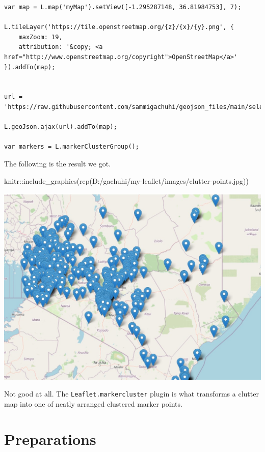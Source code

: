 \documentclass[
]{book}
\newenvironment{Shaded}{\begin{snugshade}}{\end{snugshade}}
\newcommand{\FunctionTok}[1]{\textcolor[rgb]{0.00,0.00,0.00}{#1}}
\newcommand{\NormalTok}[1]{#1}
\newcommand{\SpecialCharTok}[1]{\textcolor[rgb]{0.00,0.00,0.00}{#1}}
\newcommand{\StringTok}[1]{\textcolor[rgb]{0.31,0.60,0.02}{#1}}
\begin{document}
\begin{verbatim}
var map = L.map('myMap').setView([-1.295287148, 36.81984753], 7);

L.tileLayer('https://tile.openstreetmap.org/{z}/{x}/{y}.png', {
    maxZoom: 19,
    attribution: '&copy; <a href="http://www.openstreetmap.org/copyright">OpenStreetMap</a>'
}).addTo(map);


url = 'https://raw.githubusercontent.com/sammigachuhi/geojson_files/main/selected_hospitals.json'

L.geoJson.ajax(url).addTo(map);

var markers = L.markerClusterGroup();
\end{verbatim}

The following is the result we got.

\begin{Shaded}
\begin{Highlighting}[]
\NormalTok{knitr}\SpecialCharTok{::}\FunctionTok{include\_graphics}\NormalTok{(}\FunctionTok{rep}\NormalTok{(}\StringTok{\textquotesingle{}D:/gachuhi/my{-}leaflet/images/clutter{-}points.jpg\textquotesingle{}}\NormalTok{))}
\end{Highlighting}
\end{Shaded}

\includegraphics[width=14.28in]{../images/clutter-points}

Not good at all. The \texttt{Leaflet.markercluster} plugin is what transforms a clutter map into one of neatly arranged clustered marker points.

\hypertarget{preparations}{%
\section{Preparations}\label{preparations}}
\end{document}
